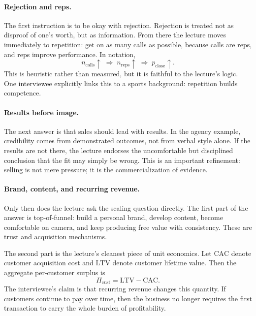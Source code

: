 \paragraph{Rejection and reps.}
The first instruction is to be okay with rejection. Rejection is treated not as disproof of one's worth, but as information. From there the lecture moves immediately to repetition: get on as many calls as possible, because calls are reps, and reps improve performance. In notation,
\begin{equation}
n_{\mathrm{calls}} \uparrow
\;\Longrightarrow\;
n_{\mathrm{reps}} \uparrow
\;\Longrightarrow\;
p_{\mathrm{close}} \uparrow.
\end{equation}
This is heuristic rather than measured, but it is faithful to the lecture's logic. One interviewee explicitly links this to a sports background: repetition builds competence.

\paragraph{Results before image.}
The next answer is that sales should lead with results. In the agency example, credibility comes from demonstrated outcomes, not from verbal style alone. If the results are not there, the lecture endorses the uncomfortable but disciplined conclusion that the fit may simply be wrong. This is an important refinement: selling is not mere pressure; it is the commercialization of evidence.

\paragraph{Brand, content, and recurring revenue.}
Only then does the lecture ask the scaling question directly. The first part of the answer is top-of-funnel: build a personal brand, develop content, become comfortable on camera, and keep producing free value with consistency. These are trust and acquisition mechanisms.

The second part is the lecture's cleanest piece of unit economics. Let \(\mathrm{CAC}\) denote customer acquisition cost and \(\mathrm{LTV}\) denote customer lifetime value. Then the aggregate per-customer surplus is
\begin{equation}
\Pi_{\mathrm{cust}}=\mathrm{LTV}-\mathrm{CAC}.
\end{equation}
The interviewee's claim is that recurring revenue changes this quantity. If customers continue to pay over time, then the business no longer requires the first transaction to carry the whole burden of profitability.

